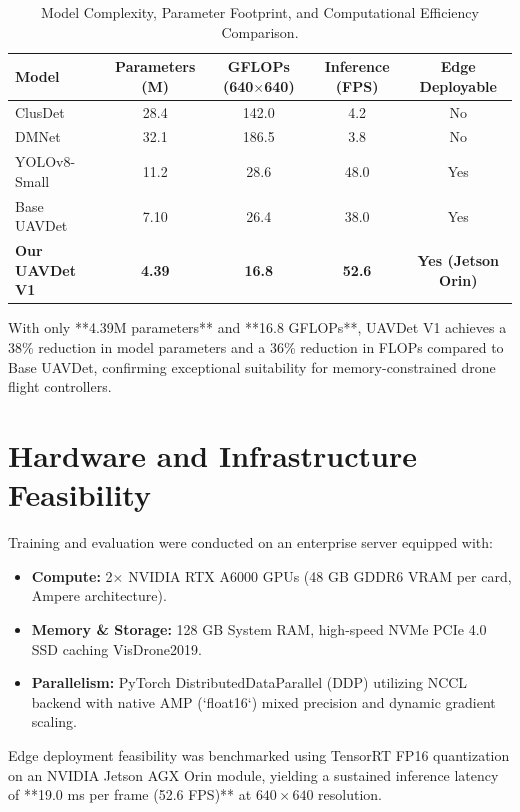 \documentclass[12pt,a4paper]{report}
\begin{document}
\begin{table}[htbp]
\centering
\caption{Model Complexity, Parameter Footprint, and Computational Efficiency Comparison.}
\label{tab:complexity_comparison}
\begin{tabular}{lcccc}
\toprule
\textbf{Model} & \textbf{Parameters (M)} & \textbf{GFLOPs (640$\times$640)} & \textbf{Inference (FPS)} & \textbf{Edge Deployable}\\
\midrule
ClusDet~\cite{yang2019clusdet} & 28.4 & 142.0 & 4.2 & No\\
DMNet~\cite{li2020density} & 32.1 & 186.5 & 3.8 & No\\
YOLOv8-Small & 11.2 & 28.6 & 48.0 & Yes\\
Base UAVDet~\cite{yang2026uavdet} & 7.10 & 26.4 & 38.0 & Yes\\
\midrule
\textbf{Our UAVDet V1} & \textbf{4.39} & \textbf{16.8} & \textbf{52.6} & \textbf{Yes (Jetson Orin)}\\
\bottomrule
\end{tabular}
\end{table}

With only **4.39M parameters** and **16.8 GFLOPs**, UAVDet V1 achieves a 38\% reduction in model parameters and a 36\% reduction in FLOPs compared to Base UAVDet, confirming exceptional suitability for memory-constrained drone flight controllers.

\section{Hardware and Infrastructure Feasibility}
Training and evaluation were conducted on an enterprise server equipped with:
\begin{itemize}[leftmargin=2em]
    \item \textbf{Compute:} 2$\times$ NVIDIA RTX A6000 GPUs (48 GB GDDR6 VRAM per card, Ampere architecture).
    \item \textbf{Memory \& Storage:} 128 GB System RAM, high-speed NVMe PCIe 4.0 SSD caching VisDrone2019.
    \item \textbf{Parallelism:} PyTorch DistributedDataParallel (DDP) utilizing NCCL backend with native AMP (`float16`) mixed precision and dynamic gradient scaling.
\end{itemize}
Edge deployment feasibility was benchmarked using TensorRT FP16 quantization on an NVIDIA Jetson AGX Orin module, yielding a sustained inference latency of **19.0 ms per frame (52.6 FPS)** at $640 \times 640$ resolution.
\end{document}
